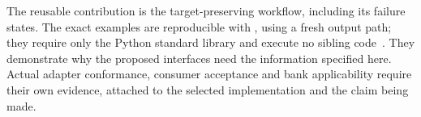 The reusable contribution is the target-preserving workflow, including its
failure states. The exact examples are reproducible with
, using a fresh output path; they
require only the Python standard library and execute no sibling code~\citep{exec13_i3_examples}. They demonstrate why the proposed interfaces need
the information specified here. Actual adapter conformance, consumer
acceptance and bank applicability require their own evidence, attached to
the selected implementation and the claim being made.

